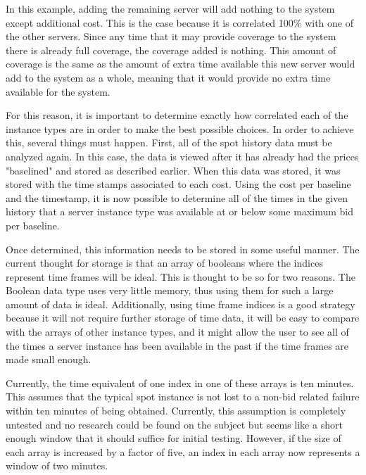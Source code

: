 \documentclass[thesis,proposal]{umassthesis}  %
\begin{document}
In this example, adding the remaining server will add nothing to the system except additional cost. This is the case because it is correlated 100\% with one of the other servers. Since any time that it may provide coverage to the system there is already full coverage, the coverage added is nothing. This amount of coverage is the same as the amount of extra time available this new server would add to the system as a whole, meaning that it would provide no extra time available for the system.\par

For this reason, it is important to determine exactly how correlated each of the instance types are in order to make the best possible choices. In order to achieve this, several things must happen. First, all of the spot history data must be analyzed again. In this case, the data is viewed after it has already had the prices "baselined" and stored as described earlier. When this data was stored, it was stored with the time stamps associated to each cost. Using the cost per baseline and the timestamp, it is now possible to determine all of the times in the given history that a server instance type was available at or below some maximum bid per baseline.\par

Once determined, this information needs to be stored in some useful manner. The current thought for storage is that an array of booleans where the indices represent time frames will be ideal. This is thought to be so for two reasons. The Boolean data type uses very little memory, thus using them for such a large amount of data is ideal. Additionally, using time frame indices is a good strategy because it will not require further storage of time data, it will be easy to compare with the arrays of other instance types, and it might allow the user to see all of the times a server instance has been available in the past if the time frames are made small enough.\par

Currently, the time equivalent of one index in one of these arrays is ten minutes. This assumes that the typical spot instance is not lost to a non-bid related failure within ten minutes of being obtained. Currently, this assumption is completely untested and no research could be found on the subject but seems like a short enough window that it should suffice for initial testing. However, if the size of each array is increased by a factor of five, an index in each array now represents a window of two minutes.\par
\end{document}
